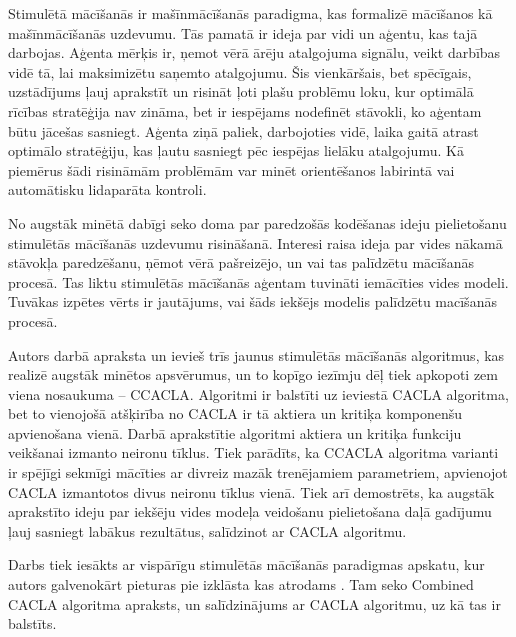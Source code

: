 \documentclass{ludis} %
\begin{document}
Stimulētā mācīšanās ir mašīnmācīšanās paradigma, kas formalizē mācīšanos kā
mašīnmācīšanās uzdevumu. Tās pamatā ir ideja par vidi un aģentu, kas tajā
darbojas. Aģenta mērķis ir, ņemot vērā ārēju atalgojuma signālu, veikt darbības
vidē tā, lai maksimizētu saņemto atalgojumu. Šis vienkāršais, bet spēcīgais,
uzstādījums ļauj aprakstīt un risināt ļoti plašu problēmu loku, kur optimālā
rīcības stratēģija nav zināma, bet ir iespējams nodefinēt stāvokli, ko aģentam
būtu jācešas sasniegt. Aģenta ziņā paliek, darbojoties vidē, laika gaitā atrast
optimālo stratēģiju, kas ļautu sasniegt pēc iespējas lielāku atalgojumu. Kā
piemērus šādi risināmām problēmām var minēt orientēšanos labirintā vai
automātisku lidaparāta kontroli.

No augstāk minētā dabīgi seko doma par paredzošās kodēšanas ideju pielietošanu
stimulētās mācīšanās uzdevumu risināšanā. Interesi raisa ideja par vides nākamā
stāvokļa paredzēšanu, ņēmot vērā pašreizējo, un vai tas palīdzētu mācīšanās
procesā. Tas liktu stimulētās mācīšanās aģentam tuvināti iemācīties vides
modeli. Tuvākas izpētes vērts ir jautājums, vai šāds iekšējs modelis palīdzētu
macīšanās procesā.


Autors darbā apraksta un ievieš trīs jaunus stimulētās mācīšanās algoritmus, kas
realizē augstāk minētos apsvērumus, un to kopīgo iezīmju dēļ tiek apkopoti zem
viena nosaukuma -- CCACLA. Algoritmi ir balstīti uz \autocite{Hasselt2009}
ieviestā CACLA algoritma, bet to vienojošā atšķirība no CACLA ir tā aktiera un
kritiķa komponenšu apvienošana vienā. Darbā aprakstītie algoritmi aktiera un
kritiķa funkciju veikšanai izmanto neironu tīklus. Tiek parādīts, ka CCACLA
algoritma varianti ir spējīgi sekmīgi mācīties ar divreiz mazāk trenējamiem
parametriem, apvienojot CACLA izmantotos divus neironu tīklus vienā. Tiek arī
demostrēts, ka augstāk aprakstīto ideju par iekšēju vides modeļa veidošanu
pielietošana daļā gadījumu ļauj sasniegt labākus rezultātus, salīdzinot ar CACLA
algoritmu.

Darbs tiek iesākts ar vispārīgu stimulētās mācīšanās paradigmas apskatu, kur
autors galvenokārt pieturas pie izklāsta kas atrodams \autocite{Krislauks2015}.
Tam seko Combined CACLA algoritma apraksts, un salīdzinājums ar CACLA algoritmu, uz
kā tas ir balstīts.
\end{document}
